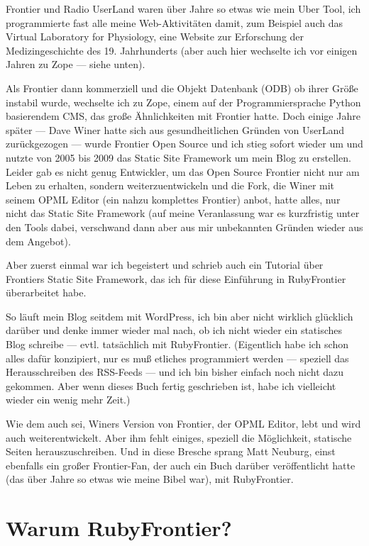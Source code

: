 \documentclass[11pt]{report}
\begin{document}
Frontier und Radio UserLand waren über Jahre so etwas wie mein Uber
Tool, ich programmierte fast alle meine Web-Aktivitäten damit, zum
Beispiel auch das Virtual Laboratory for Physiology, eine Website zur
Erforschung der Medizingeschichte des 19. Jahrhunderts (aber auch hier
wechselte ich vor einigen Jahren zu Zope — siehe unten).


Als Frontier dann kommerziell und die Objekt Datenbank (ODB) ob ihrer
Größe instabil wurde, wechselte ich zu Zope, einem auf der
Programmiersprache Python basierendem CMS, das große Ähnlichkeiten mit
Frontier hatte. Doch einige Jahre später — Dave Winer hatte sich aus
gesundheitlichen Gründen von UserLand zurückgezogen — wurde Frontier
Open Source und ich stieg sofort wieder um und nutzte von 2005 bis
2009 das Static Site Framework um mein Blog zu erstellen. Leider gab
es nicht genug Entwickler, um das Open Source Frontier nicht nur am
Leben zu erhalten, sondern weiterzuentwickeln und die Fork, die Winer
mit seinem OPML Editor (ein nahzu komplettes Frontier) anbot, hatte
alles, nur nicht das Static Site Framework (auf meine Veranlassung war
es kurzfristig unter den Tools dabei, verschwand dann aber aus mir
unbekannten Gründen wieder aus dem Angebot).


Aber zuerst einmal war ich begeistert und schrieb auch ein Tutorial
über Frontiers Static Site Framework, das ich für diese Einführung in
RubyFrontier überarbeitet habe.


So läuft mein Blog seitdem mit WordPress, ich bin aber nicht wirklich
glücklich darüber und denke immer wieder mal nach, ob ich nicht wieder
ein statisches Blog schreibe — evtl. tatsächlich mit
RubyFrontier. (Eigentlich habe ich schon alles dafür konzipiert, nur
es muß etliches programmiert werden — speziell das Herausschreiben des
RSS-Feeds — und ich bin bisher einfach noch nicht dazu gekommen. Aber
wenn dieses Buch fertig geschrieben ist, habe ich vielleicht wieder
ein wenig mehr Zeit.)


Wie dem auch sei, Winers Version von Frontier, der OPML Editor, lebt
und wird auch weiterentwickelt. Aber ihm fehlt einiges, speziell die
Möglichkeit, statische Seiten herauszuschreiben. Und in diese Bresche
sprang Matt Neuburg, einst ebenfalls ein großer Frontier-Fan, der auch
ein Buch darüber veröffentlicht hatte (das über Jahre so etwas wie
meine Bibel war), mit RubyFrontier.
\section{Warum RubyFrontier?}
\label{sec-1-1-2}
\end{document}
